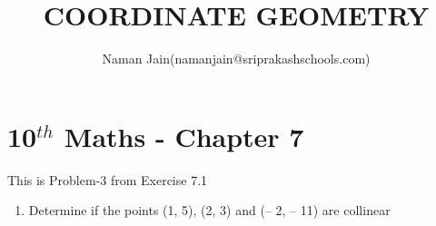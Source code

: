 \documentclass[12pt]{article}
\title{COORDINATE GEOMETRY}
\author{Naman Jain(namanjain@sriprakashschools.com)}
\begin{document}
\maketitle
\section*{10$^{th}$ Maths - Chapter 7}
This is Problem-3 from Exercise 7.1
\begin{enumerate}
\item Determine if the points (1, 5), (2, 3) and (– 2, – 11) are collinear \\

\end{enumerate}
\end{document}
